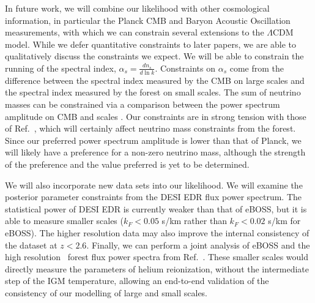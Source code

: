 In future work, we will combine our \Lya likelihood with other cosmological information, in particular the Planck CMB and Baryon Acoustic Oscillation measurements, with which we can constrain several extensions to the $\Lambda$CDM model.
While we defer quantitative constraints to later papers, we are able to qualitatively discuss the constraints we expect.
We will be able to constrain the running of the spectral index, $\alpha_s = \frac{d n_s}{d \ln k}$.
Constraints on $\alpha_s$ come from the difference between the spectral index measured by the CMB on large scales and the spectral index measured by the \Lya forest on small scales.
The sum of neutrino masses can be constrained via a comparison between the power spectrum amplitude on CMB and \Lya scales \cite{2020JCAP...04..025P}. Our constraints are in strong tension with those of Ref.~\cite{2020JCAP...04..038P}, which will certainly affect neutrino mass constraints from the \Lya forest.
Since our preferred power spectrum amplitude is lower than that of Planck, we will likely have a preference for a non-zero neutrino mass, although the strength of the preference and the value preferred is yet to be determined. 

We will also incorporate new data sets into our likelihood.
We will examine the posterior parameter constraints from the DESI EDR flux power spectrum.
The statistical power of DESI EDR is currently weaker than that of eBOSS, but it is able to measure smaller scales ($k_F < 0.05$ s/km rather than $k_F < 0.02$ s/km for eBOSS).
The higher resolution data may also improve the internal consistency of the dataset at $z < 2.6$.
Finally, we can perform a joint analysis of eBOSS and the high resolution \Lya~forest flux power spectra from Ref.~\cite{2022MNRAS.509.2842K}.
These smaller scales would directly measure the parameters of helium reionization, without the intermediate step of the IGM temperature, allowing an end-to-end validation of the consistency of our modelling of large and small scales.

